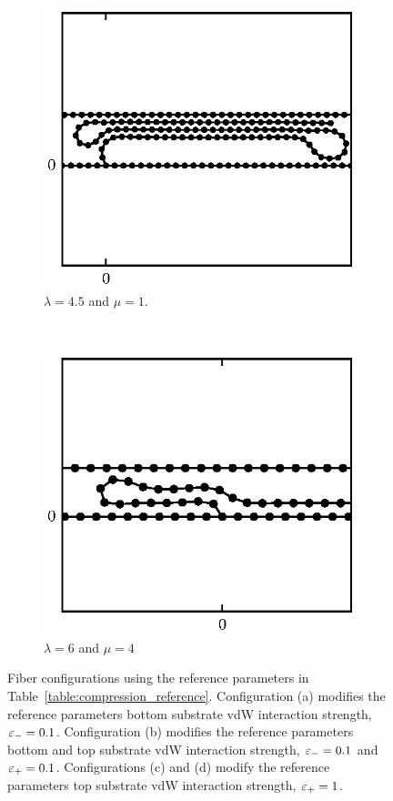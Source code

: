 \begin{figure}
		\begin{subfigure}{.5\textwidth}
			\centering
			\includegraphics{./fig/ch3/push/et0.1/l4.5_m1.eps}
			\caption{$\lambda=4.5$ and $\mu=1$.\label{subfig:bridge}}
		\end{subfigure}%
		~
		\begin{subfigure}{.5\textwidth}
			\centering
			\includegraphics{./fig/ch3/push/et0.1/l6_m4.eps}
			\caption{$\lambda=6$ and $\mu=4$\label{subfig:hump}}
		\end{subfigure}	
		\caption{Fiber configurations using the reference parameters in Table~\ref{table:compression_reference}. Configuration (a) modifies the reference parameters bottom substrate vdW interaction strength, $\varepsilon_-=0.1$. Configuration (b) modifies the reference parameters bottom and top substrate vdW interaction strength, $\varepsilon_-=0.1$ and $\varepsilon_+=0.1$. Configurations (c) and (d) modify the reference parameters top substrate vdW interaction strength, $\varepsilon_+=1$.\label{fig:vdw_crushed}}	
	\end{figure}

